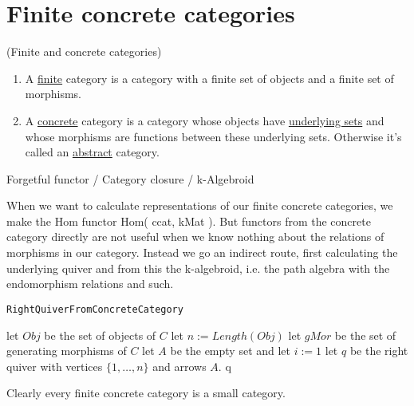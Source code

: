 
\section{Finite concrete categories}

\begin{definition}{(Finite and concrete categories)}
\renewcommand{\labelenumi}{(\theenumi)}
\begin{enumerate}
\item A \ul{finite} category is a category with a finite set of objects and a finite set of morphisms.
\item A \ul{concrete} category is a category whose objects have \ul{underlying sets} and whose morphisms are functions between these
underlying sets. Otherwise it's called an \ul{abstract} category.
\end{enumerate}
\end{definition}

\begin{example}
Forgetful functor / Category closure / k-Algebroid
\end{example}

When we want to calculate representations of our finite concrete categories, we make the Hom functor Hom( ccat, kMat ).
But functors from the concrete category directly are not useful when we know nothing about the relations of morphisms
in our category.
Instead we go an indirect route, first calculating the underlying quiver and from this the k-algebroid, i.e. the path algebra
with the endomorphism relations and such.

\begin{algorithm}\capstart
    \caption{\texttt{RightQuiverFromConcreteCategory}}\label{algo:RightQuiverFromConcreteCategory}
	\BlankLine
	let $Obj$ be the set of objects of $C$\;
	let $n := Length(Obj)$\;
	let $gMor$ be the set of generating morphisms of $C$\;
	let $A$ be the empty set and let $i := 1$\;
	\BlankLine
	let $q$ be the right quiver with vertices $\{1,\dots,n\}$ and arrows $A$.
	\BlankLine
	\Return q\;
\end{algorithm}

Clearly every finite concrete category is a small category.

